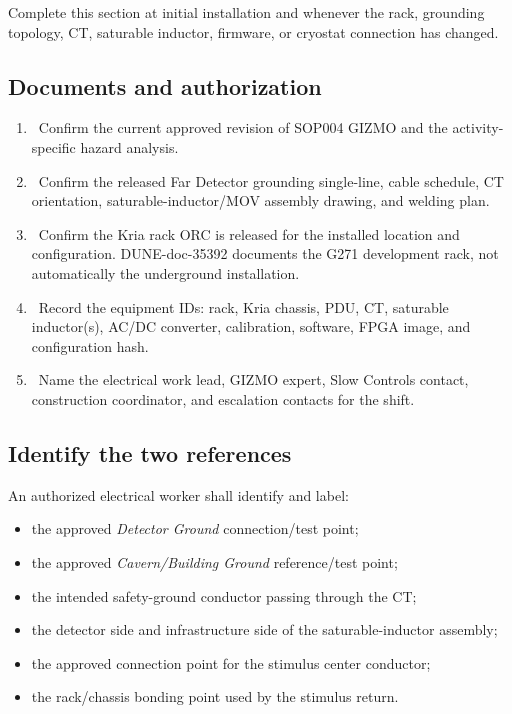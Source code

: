 \documentclass[11pt]{article}
\newcommand{\GIZMO}{\textsc{GIZMO}}
\newcommand{\DetectorGround}{\textit{Detector Ground}}
\newcommand{\InfrastructureGround}{\textit{Cavern/Building Ground}}
\newcommand{\checkbox}{\raisebox{0.15ex}{\fbox{\rule{0pt}{1.15ex}\rule{1.15ex}{0pt}}}}
\begin{document}
Complete this section at initial installation and whenever the rack, grounding topology, CT, saturable inductor, firmware, or cryostat connection has changed.

\subsection{Documents and authorization}

\begin{enumerate}
  \item \checkbox\ Confirm the current approved revision of SOP004 GIZMO and the activity-specific hazard analysis.
  \item \checkbox\ Confirm the released Far Detector grounding single-line, cable schedule, CT orientation, saturable-inductor/MOV assembly drawing, and welding plan.
  \item \checkbox\ Confirm the Kria rack ORC is released for the installed location and configuration. DUNE-doc-35392 documents the G271 development rack, not automatically the underground installation.
  \item \checkbox\ Record the equipment IDs: rack, Kria chassis, PDU, CT, saturable inductor(s), AC/DC converter, calibration, software, FPGA image, and configuration hash.
  \item \checkbox\ Name the electrical work lead, \GIZMO{} expert, Slow Controls contact, construction coordinator, and escalation contacts for the shift.
\end{enumerate}

\subsection{Identify the two references}

An authorized electrical worker shall identify and label:

\begin{itemize}
  \item the approved \DetectorGround{} connection/test point;
  \item the approved \InfrastructureGround{} reference/test point;
  \item the intended safety-ground conductor passing through the CT;
  \item the detector side and infrastructure side of the saturable-inductor assembly;
  \item the approved connection point for the stimulus center conductor;
  \item the rack/chassis bonding point used by the stimulus return.
\end{itemize}
\end{document}
